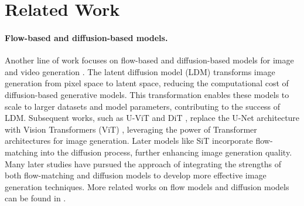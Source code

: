 
\section{Related Work}\label{sec:related_work}



\paragraph{Flow-based and diffusion-based models.} Another line of work focuses on flow-based and diffusion-based models for image and video generation \cite{hja20,hhs23,ltl+24}. The latent diffusion model (LDM) \cite{rbl+22} transforms image generation from pixel space to latent space, reducing the computational cost of diffusion-based generative models. This transformation enables these models to scale to larger datasets and model parameters, contributing to the success of LDM. Subsequent works, such as  U-ViT \cite{bnx+23} and  DiT \cite{px23}, replace the U-Net architecture with Vision Transformers (ViT) \cite{d20}, leveraging the power of Transformer architectures for image generation. Later models like SiT \cite{aak21} incorporate flow-matching into the diffusion process, further enhancing image generation quality. Many later studies \cite{ekb+24,jsl+24,wsd+24,wcz+23,wxz+24} have pursued the approach of integrating the strengths of both flow-matching and diffusion models to develop more effective image generation techniques. More related works on flow models and diffusion models can be found in \cite{hst+22,swyy23,wsd+24,lssz24_gm,llss24,hwl+24,hwsl24,lzw+24,cgl+25_homo,ccl+25,csy25,cll+25_var,cgl+25_gen,ssz+25_dit,ssz+25_prune}.

